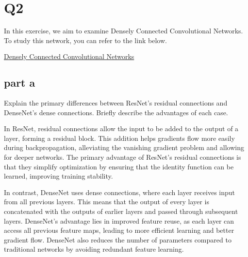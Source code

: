 \section{Q2}

In this exercise, we aim to examine Densely Connected Convolutional Networks. To study this network, you can refer to the link below.

\href{https://arxiv.org/pdf/1608.06993}{Densely Connected Convolutional Networks}

\subsection{part a}
Explain the primary differences between ResNet's residual connections and DenseNet's dense connections. Briefly describe the advantages of each case.
\begin{qsolve}
    \begin{qsolve}[]
        In ResNet, residual connections allow the input to be added to the output of a layer, forming a residual block. This addition helps gradients flow more easily during backpropagation, alleviating the vanishing gradient problem and allowing for deeper networks. The primary advantage of ResNet's residual connections is that they simplify optimization by ensuring that the identity function can be learned, improving training stability.

        In contrast, DenseNet uses dense connections, where each layer receives input from all previous layers. This means that the output of every layer is concatenated with the outputs of earlier layers and passed through subsequent layers. DenseNet's advantage lies in improved feature reuse, as each layer can access all previous feature maps, leading to more efficient learning and better gradient flow. DenseNet also reduces the number of parameters compared to traditional networks by avoiding redundant feature learning.
    
    \end{qsolve}
\end{qsolve}
